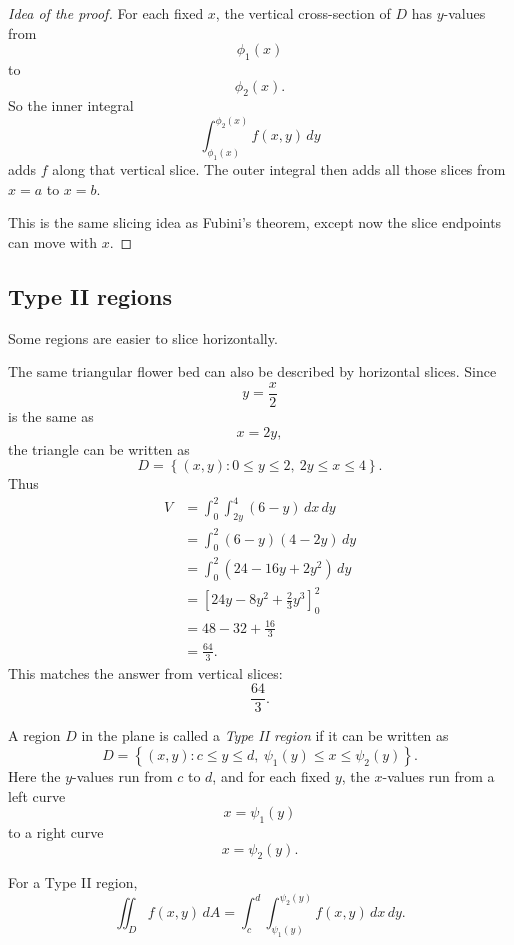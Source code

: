 \begin{proof}[Idea of the proof]
For each fixed \(x\), the vertical cross-section of \(D\) has \(y\)-values from
\[
    \phi_1(x)
\]
to
\[
    \phi_2(x).
\]
So the inner integral
\[
    \int_{\phi_1(x)}^{\phi_2(x)} f(x,y)\,dy
\]
adds \(f\) along that vertical slice.  The outer integral then adds all those slices from
\(x=a\) to \(x=b\).

This is the same slicing idea as Fubini's theorem, except now the slice endpoints can move
with \(x\).
\end{proof}

\subsection{Type II regions}

Some regions are easier to slice horizontally.

The same triangular flower bed can also be described by horizontal slices.  Since
\[
    y=\frac{x}{2}
\]
is the same as
\[
    x=2y,
\]
the triangle can be written as
\[
    D=
    \left\{
        (x,y):
        0\le y\le2,\ 
        2y\le x\le4
    \right\}.
\]
Thus
\[
\begin{aligned}
    V
    &=
    \int_0^2\int_{2y}^4 (6-y)\,dx\,dy\\
    &=
    \int_0^2 (6-y)(4-2y)\,dy\\
    &=
    \int_0^2 (24-16y+2y^2)\,dy\\
    &=
    \left[
        24y-8y^2+\frac23y^3
    \right]_0^2\\
    &=
    48-32+\frac{16}{3}\\
    &=
    \frac{64}{3}.
\end{aligned}
\]
This matches the answer from vertical slices:
\[
\boxed{
    \frac{64}{3}.
}
\]

\begin{definition}
A region \(D\) in the plane is called a \emph{Type II region} if it can be written as
\[
\boxed{
    D=
    \left\{
        (x,y):
        c\le y\le d,\ 
        \psi_1(y)\le x\le \psi_2(y)
    \right\}.
}
\]
Here the \(y\)-values run from \(c\) to \(d\), and for each fixed \(y\), the \(x\)-values run
from a left curve
\[
    x=\psi_1(y)
\]
to a right curve
\[
    x=\psi_2(y).
\]
\end{definition}

For a Type II region,
\[
\boxed{
    \iint_D f(x,y)\,dA
    =
    \int_c^d
    \int_{\psi_1(y)}^{\psi_2(y)}
    f(x,y)\,dx\,dy.
}
\]

